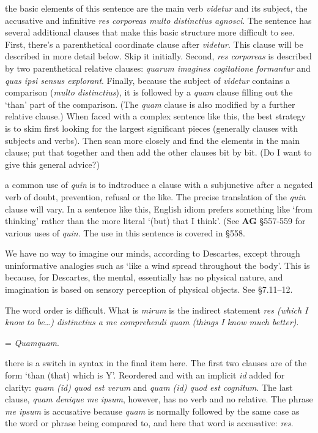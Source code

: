  the basic elements of this sentence are the main verb \textit{videtur} and its subject, the accusative and infinitive \textit{res corporeas multo distinctius agnosci}. The sentence has several additional clauses that make this basic structure more difficult to see. First, there's a parenthetical coordinate clause after \textit{videtur}. This clause will be described in more detail below. Skip it initially. Second, \textit{res corporeas} is described by two parenthetical relative clauses: \textit{quarum imagines cogitatione formantur} and \textit{quas ipsi sensus explorant}. Finally, because the subject of \textit{videtur} contains a comparison (\textit{multo distinctius}), it is followed by a \textit{quam} clause filling out the `than' part of the comparison. (The \textit{quam} clause is also modified by a further relative clause.) When faced with a complex sentence like this, the best strategy is to skim first looking for the largest significant pieces (generally clauses with subjects and verbs). Then scan more closely and find the elements in the main clause; put that together and then add the other clauses bit by bit. (Do I want to give this general advice?)

 a common use of \textit{quin} is to indtroduce a clause with a subjunctive after a negated verb of doubt, prevention, refusal or the like. The precise translation of the \textit{quin} clause will vary. In a sentence like this, English idiom prefers something like `from thinking' rather than the more literal `(but) that I think'. (See \textbf{AG} §557-559 for various uses of \textit{quin}. The use in this sentence is covered in §558.

 We have no way to imagine our minds, according to Descartes, except through uninformative analogies such as `like a wind spread throughout the body'. This is because, for Descartes, the mental, essentially has no physical nature, and imagination is based on sensory perception of physical objects. See §7.11--12.

 The word order is difficult. What is \textit{mirum} is the indirect statement \textit{res (which I know to be\dots) distinctius a me comprehendi quam (things I know much better)}.

 = \textit{Quamquam}.

 there is a switch in syntax in the final item here. The first two clauses are  of the form `than (that) which is Y'. Reordered and with an implicit \textit{id} added for clarity: \textit{quam (id) quod est verum} and \textit{quam (id) quod est cognitum}. The last clause, \textit{quam denique me ipsum}, however, has no verb and no relative. The phrase \textit{me ipsum} is accusative because \textit{quam} is normally followed by the same case as the word or phrase being compared to, and here that word is accusative: \textit{res}.

